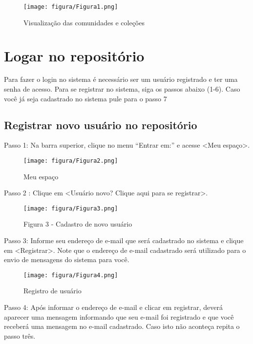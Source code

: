 \documentclass[12pt,hidelinks]{article}
\begin{document}
        \begin{figure}[!htp]
                \centering
                \texttt{[image: figura/Figura1.png]}
                \caption{Visualização das comunidades e coleções}
            \label{Rotulo}
        \end{figure}
        
\newpage
\section{Logar no repositório}
\newpage
    Para fazer o login no sistema é necessário ser um usuário registrado e ter uma senha de acesso. Para se registrar no sistema, siga os passos abaixo (1-6). Caso você já seja cadastrado no sistema pule para o passo 7
    \subsection{Registrar novo usuário no repositório}
    
    Passo 1: Na barra superior, clique no menu “Entrar em:” e acesse <Meu espaço>.
     \begin{figure}[!htp]
                \centering
                \texttt{[image: figura/Figura2.png]}
                \caption{Meu espaço}
            \label{Rotulo}
        \end{figure}   
        
       Passo 2 : Clique em <Usuário novo? Clique aqui para se registrar>. 
       
       \begin{figure}[!htp]
                \centering
                \texttt{[image: figura/Figura3.png]}
                \caption{Figura 3 - Cadastro de novo usuário}
            \label{Rotulo}
        \end{figure}  
        
    
        Passo 3: Informe seu endereço de e-mail que será cadastrado no sistema e clique em <Registrar>. Note que o endereço de e-mail cadastrado será utilizado para o envio de mensagens do sistema para você.
        
        \begin{figure}[!htp]
                \centering
                \texttt{[image: figura/Figura4.png]}
                \caption{Registro de usuário}
            \label{Rotulo}
        \end{figure}
\newpage        
        Passo 4: Após informar o endereço de e-mail e clicar em registrar, deverá aparecer uma mensagem informando que seu e-mail foi registrado e que você receberá uma mensagem no e-mail cadastrado. Caso isto não aconteça repita o passo três.
        
\end{document}
